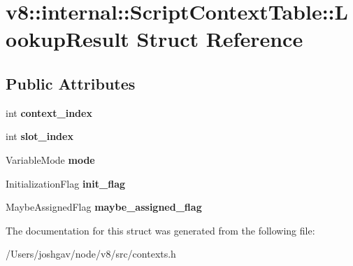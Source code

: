 \hypertarget{structv8_1_1internal_1_1_script_context_table_1_1_lookup_result}{}\section{v8\+:\+:internal\+:\+:Script\+Context\+Table\+:\+:Lookup\+Result Struct Reference}
\label{structv8_1_1internal_1_1_script_context_table_1_1_lookup_result}
\subsection*{Public Attributes}
\begin{DoxyCompactItemize}
\item 
int {\bfseries context\+\_\+index}\hypertarget{structv8_1_1internal_1_1_script_context_table_1_1_lookup_result_a9dd961b81d9e2b4ea670884db1e68662}{}\label{structv8_1_1internal_1_1_script_context_table_1_1_lookup_result_a9dd961b81d9e2b4ea670884db1e68662}

\item 
int {\bfseries slot\+\_\+index}\hypertarget{structv8_1_1internal_1_1_script_context_table_1_1_lookup_result_a5ae6b82c7056ff4021919c585d29ef7b}{}\label{structv8_1_1internal_1_1_script_context_table_1_1_lookup_result_a5ae6b82c7056ff4021919c585d29ef7b}

\item 
Variable\+Mode {\bfseries mode}\hypertarget{structv8_1_1internal_1_1_script_context_table_1_1_lookup_result_a3900356f30ed0ff4da71d6dbfe861edd}{}\label{structv8_1_1internal_1_1_script_context_table_1_1_lookup_result_a3900356f30ed0ff4da71d6dbfe861edd}

\item 
Initialization\+Flag {\bfseries init\+\_\+flag}\hypertarget{structv8_1_1internal_1_1_script_context_table_1_1_lookup_result_a063fc47e9238f03f628ec404481ee3da}{}\label{structv8_1_1internal_1_1_script_context_table_1_1_lookup_result_a063fc47e9238f03f628ec404481ee3da}

\item 
Maybe\+Assigned\+Flag {\bfseries maybe\+\_\+assigned\+\_\+flag}\hypertarget{structv8_1_1internal_1_1_script_context_table_1_1_lookup_result_af419a2ccd3b19aa5e14beedaf8aadf34}{}\label{structv8_1_1internal_1_1_script_context_table_1_1_lookup_result_af419a2ccd3b19aa5e14beedaf8aadf34}

\end{DoxyCompactItemize}


The documentation for this struct was generated from the following file\+:\begin{DoxyCompactItemize}
\item 
/\+Users/joshgav/node/v8/src/contexts.\+h\end{DoxyCompactItemize}
